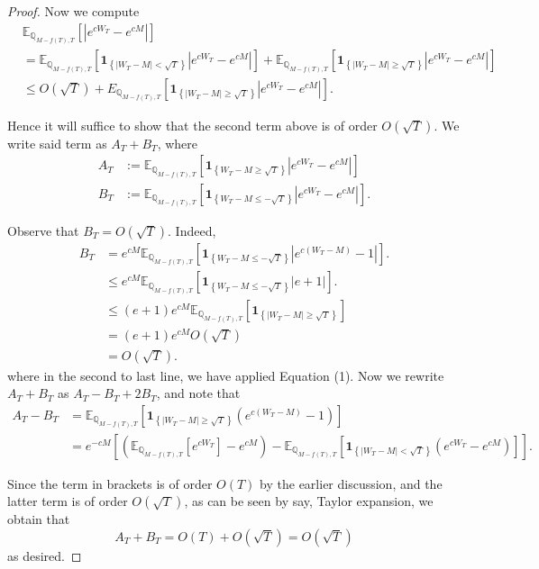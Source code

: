 \documentclass{article}
\theoremstyle{definition}
\theoremstyle{definition}
\begin{document}
\begin{proof}
Now we compute
$$
\begin{aligned}
& \mathbb{E}_{\mathbb{Q}_{M-f(T), T}}\left[\left|e^{c W_{T}}-e^{c M}\right|\right] \\
& =\mathbb{E}_{\mathbb{Q}_{M-f(T), T}}\left[\mathbf{1}_{\left\{\left|W_{T}-M\right|<\sqrt{T}\right\}}\left|e^{c W_{T}}-e^{c M}\right|\right]+\mathbb{E}_{\mathbb{Q}_{M-f(T), T}}\left[\mathbf{1}_{\left\{\left|W_{T}-M\right| \geq \sqrt{T}\right\}}\left|e^{c W_{T}}-e^{c M}\right|\right] \\
& \leq O(\sqrt{T})+E_{\mathbb{Q}_{M-f(T), T}}\left[\mathbf{1}_{\left\{\left|W_{T}-M\right| \geq \sqrt{T}\right\}}\left|e^{c W_{T}}-e^{c M}\right|\right] .
\end{aligned}
$$

Hence it will suffice to show that the second term above is of order $O(\sqrt{T})$. We write said term as $A_{T}+B_{T}$, where
$$
\begin{aligned}
A_{T} & :=\mathbb{E}_{\mathbb{Q}_{M-f(T), T}}\left[\mathbf{1}_{\left\{W_{T}-M \geq \sqrt{T}\right\}}\left|e^{c W_{T}}-e^{c M}\right|\right] \\
B_{T} & :=\mathbb{E}_{\mathbb{Q}_{M-f(T), T}}\left[\mathbf{1}_{\left\{W_{T}-M \leq-\sqrt{T}\right\}}\left|e^{c W_{T}}-e^{c M}\right|\right] .
\end{aligned}
$$

Observe that $B_{T}=O(\sqrt{T})$. Indeed,
$$
\begin{aligned}
B_{T} & =e^{c M} \mathbb{E}_{\mathbb{Q}_{M-f(T), T}}\left[\mathbf{1}_{\left\{W_{T}-M \leq-\sqrt{T}\right\}}\left|e^{c\left(W_{T}-M\right)}-1\right|\right] . \\
& \leq e^{c M} \mathbb{E}_{\mathbb{Q}_{M-f(T), T}}\left[\mathbf{1}_{\left\{W_{T}-M \leq-\sqrt{T}\right\}}|e+1|\right] . \\
& \leq(e+1) e^{c M} \mathbb{E}_{\mathbb{Q}_{M-f(T), T}}\left[\mathbf{1}_{\left\{\left|W_{T}-M\right| \geq \sqrt{T}\right\}}\right] \\
& =(e+1) e^{c M} O(\sqrt{T}) \\
& =O(\sqrt{T}) .
\end{aligned}
$$
where in the second to last line, we have applied Equation (1). Now we rewrite $A_{T}+B_{T}$ as $A_{T}-B_{T}+2 B_{T}$, and note that
$$
\begin{aligned}
A_{T}-B_{T} & =\mathbb{E}_{\mathbb{Q}_{M-f(T), T}}\left[\mathbf{1}_{\left\{\left|W_{T}-M\right| \geq \sqrt{T}\right\}}\left(e^{c\left(W_{T}-M\right)}-1\right)\right] \\
& =e^{-c M}\left[\left(\mathbb{E}_{\mathbb{Q}_{M-f(T), T}}\left[e^{c W_{T}}\right]-e^{c M}\right)-\mathbb{E}_{\mathbb{Q}_{M-f(T), T}}\left[\mathbf{1}_{\left\{\left|W_{T}-M\right|<\sqrt{T}\right\}}\left(e^{c W_{T}}-e^{c M}\right)\right]\right] .
\end{aligned}
$$

Since the term in brackets is of order $O(T)$ by the earlier discussion, and the latter term is of order $O(\sqrt{T})$, as can be seen by say, Taylor expansion, we obtain that
$$
A_{T}+B_{T}=O(T)+O(\sqrt{T})=O(\sqrt{T})
$$
as desired.
\end{proof}
\end{document}
